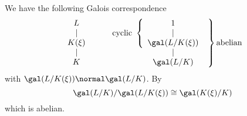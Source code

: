 \documentclass[a4paper]{article}
\begin{document}
\begin{remark}
  We have the following Galois correspondence
  \[
    \begin{array}[h]{c}
      L \\
      | \\
      K(\xi) \\
      | \\
      K
    \end{array}
    \qquad
    \left.
    \begin{array}[h]{c}
      \text{cyclic }\left\{
      \begin{array}[h]{c}
      1 \\
      | \\
      \gal(L/K(\xi))
      \end{array}
      \right. \\
      \hspace{37pt} | \\
      \hspace{37pt} \gal(L/K)
    \end{array}
    \right\} \text{abelian}
  \]
  with \(\gal(L/K(\xi)) \normal \gal(L/K)\). By 
  \[
    \gal(L/K)/\gal(L/K(\xi)) \cong \gal(K(\xi)/K)
  \]
  which is abelian.
\end{remark}
\end{document}

